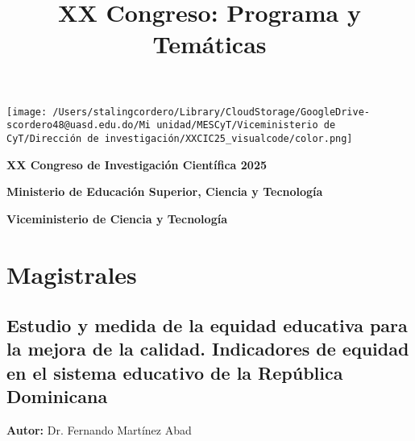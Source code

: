 \documentclass[11pt,a4paper]{article}
\title{XX Congreso: Programa y Temáticas}
\author{}
\date{}
\begin{document}
\begin{titlepage}
    \centering
    
    \texttt{[image: /Users/stalingcordero/Library/CloudStorage/GoogleDrive-scordero48@uasd.edu.do/Mi unidad/MESCyT/Viceministerio de CyT/Dirección de investigación/XXCIC25\_visualcode/color.png]} \\
    \vspace{2cm} %
    
    {\Huge \textbf{XX Congreso de Investigación Científica 2025} \par}
    \vspace{1cm}
    {\LARGE \textbf{Ministerio de Educación Superior, Ciencia y Tecnología} \par}
    \vspace{0.5cm}
    {\Large \textbf{Viceministerio de Ciencia y Tecnología} \par}
    
    \vfill  %
\end{titlepage}


\maketitle
\tableofcontents
\newpage

\section{Magistrales}

\subsection{Estudio y medida de la equidad educativa para la mejora de la calidad. Indicadores de equidad en el sistema educativo de la República Dominicana}


\noindent \textbf{Autor:} Dr. Fernando Martínez Abad \\
\end{document}
